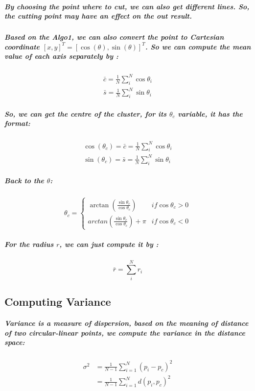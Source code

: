 \documentclass{article}
\begin{document}
\subparagraph{
By choosing the point where to cut, we can also get different lines. So, the cutting point may have an effect on the out result.
}

\subparagraph{
Based on the \textit{Algo1}, we can also convert the point to Cartesian coordinate $[x,y]^T = [\cos(\theta), \sin(\theta)]^T$. So we can compute the mean value of each axis separately by :
}

\begin{equation}
\begin{aligned}
\bar{c} = \frac{1}{N} \sum_{i}^{N}\cos{\theta_{i}} \\
\bar{s} = \frac{1}{N} \sum_{i}^{N}\sin{\theta_{i}}
\end{aligned}
\end{equation}

\subparagraph{
So, we can get the centre of the cluster, for its $\theta_c$ variable, it has the format:
}

\begin{equation}
    \begin{aligned}
    \cos(\theta_c) = \bar{c} = \frac{1}{N} \sum_{i}^{N}\cos{\theta_{i}} \\
    \sin(\theta_c) = \bar{s} = \frac{1}{N} \sum_{i}^{N}\sin{\theta_{i}}
    \end{aligned}
\end{equation}

\subparagraph{
Back to the $\theta$:
}

\begin{equation}
\theta_c =
    \begin{cases}
        \arctan{(\frac{\sin{\theta_c}}{\cos{\theta_c}})} &if \cos{\theta_c} >0\\
        arctan{(\frac{\sin{\theta_c}}{\cos{\theta_c}})}+\pi &if \cos{\theta_c} <0
    \end{cases}
\end{equation}

\subparagraph{
For the radius $r$, we can just compute it by :
}

\begin{equation}
    \bar{r} = \sum_{i}^{N}r_i
\end{equation}

\subsection{Computing Variance}
\subparagraph{
Variance is a measure of dispersion, based on the meaning of distance of two circular-linear points, we compute the variance in the distance space:
}
\begin{equation}
    \begin{aligned}
    \sigma^2 &= \frac{1}{N-1}\sum_{i=1}^{N}(p_i - p_c)^2\\
            &=\frac{1}{N-1}\sum_{i=1}^{N}d(p_i, p_c)^2
    \end{aligned}
\end{equation}
\end{document}
